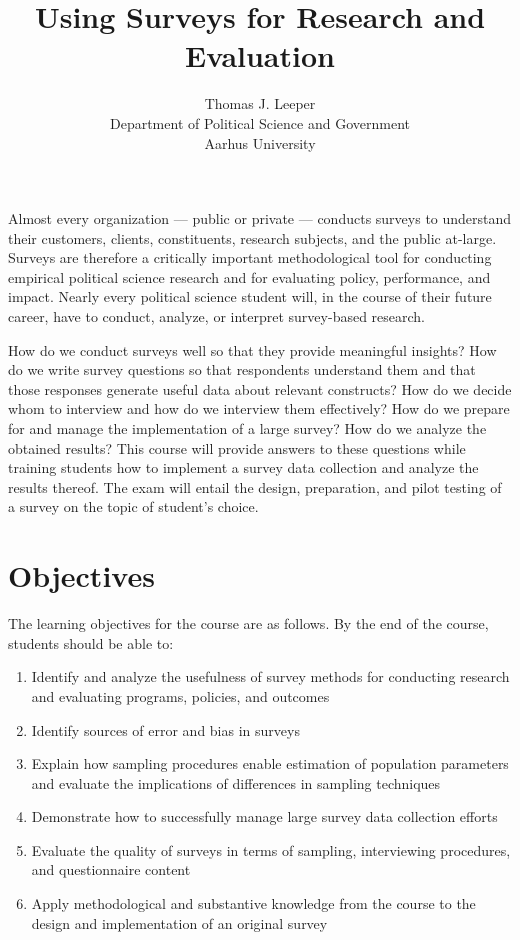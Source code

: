 \documentclass[12pt,a4paper]{article}
\title{Using Surveys for Research and Evaluation}
\author{Thomas J. Leeper\\
Department of Political Science and Government\\
Aarhus University}
\begin{document}
\nobibliography*

\maketitle

\faketableofcontents


Almost every organization --- public or private --- conducts surveys to understand their customers, clients, constituents, research subjects, and the public at-large. Surveys are therefore a critically important methodological tool for conducting empirical political science research and for evaluating policy, performance, and impact. Nearly every political science student will, in the course of their future career, have to conduct, analyze, or interpret survey-based research.

How do we conduct surveys well so that they provide meaningful insights? How do we write survey questions so that respondents understand them and that those responses generate useful data about relevant constructs? How do we decide whom to interview and how do we interview them effectively? How do we prepare for and manage the implementation of a large survey? How do we analyze the obtained results? This course will provide answers to these questions while training students how to implement a survey data collection and analyze the results thereof. The exam will entail the design, preparation, and pilot testing of a survey on the topic of student's choice.

\section{Objectives}
The learning objectives for the course are as follows. By the end of the course, students should be able to:

\begin{enumerate}
\item Identify and analyze the usefulness of survey methods for conducting research and evaluating programs, policies, and outcomes
\item Identify sources of error and bias in surveys
\item Explain how sampling procedures enable estimation of population parameters and evaluate the implications of differences in sampling techniques
\item Demonstrate how to successfully manage large survey data collection efforts
\item Evaluate the quality of surveys in terms of sampling, interviewing procedures, and questionnaire content 
\item Apply methodological and substantive knowledge from the course to the design and implementation of an original survey
\end{enumerate}
\end{document}
